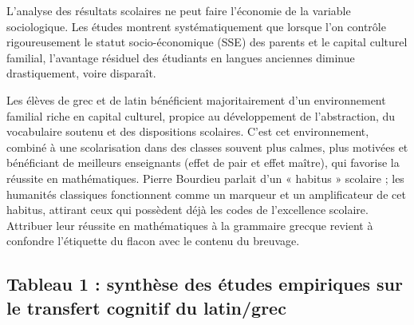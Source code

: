 L'analyse des résultats scolaires ne peut faire l'économie de la variable sociologique. Les études
montrent systématiquement que lorsque l'on contrôle rigoureusement le statut socio-économique (SSE)
des parents et le capital culturel familial, l'avantage résiduel des étudiants en langues anciennes
diminue drastiquement, voire disparaît.\cite{II-1-2-ref37}

Les élèves de grec et de latin bénéficient majoritairement d'un environnement familial riche en
capital culturel, propice au développement de l'abstraction, du vocabulaire soutenu et des
dispositions scolaires. C'est cet environnement, combiné à une scolarisation dans des classes
souvent plus calmes, plus motivées et bénéficiant de meilleurs enseignants (effet de pair et effet
maître), qui favorise la réussite en mathématiques.\cite{II-1-2-ref10} Pierre Bourdieu parlait d'un
« habitus » scolaire ; les humanités classiques fonctionnent comme un marqueur et un amplificateur
de cet habitus, attirant ceux qui possèdent déjà les codes de l'excellence
scolaire.\cite{II-1-2-ref39} Attribuer leur réussite en mathématiques à la grammaire grecque revient
à confondre l'étiquette du flacon avec le contenu du breuvage.



\subsection{Tableau 1 : synthèse des études empiriques sur le transfert cognitif du latin/grec}


